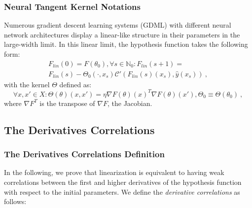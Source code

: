 \documentclass{article} %
\begin{document}
\subsubsection{Neural Tangent Kernel Notations}
\label{sec:Notations:NTK}

Numerous gradient descent learning systems (GDML) with different neural network architectures display a linear-like structure in their parameters in the large-width limit. In this linear limit, the hypothesis function takes the following form:
\begin{equation}
\begin{array}{c}
F_{lin}\left(0\right)=F\left(\theta_{0}\right),\forall s\in\mathbb{N}_{0}:F_{lin}\left(s+1\right)=\\
F_{lin}\left(s\right)-\Theta_{0}\left(\cdot,x_{s}\right)\mathcal{C}'\left(F_{lin}\left(s\right)\left(x_{s}\right),\hat{y}\left(x_{s}\right)\right)\ ,
\end{array}
\label{eq:EqOfLinF1}
\end{equation}
with the kernel $\Theta$ defined as:
\begin{equation}
\forall x,x'\in X:
\Theta\left(\theta\right)\left(x,x'\right)=\eta\nabla F\left(\theta\right)\left(x\right)^{T}\nabla F\left(\theta\right)\left(x'\right),
\Theta_{0}\equiv\Theta\left(\theta_{0}\right)\ ,
\label{eq:Kernel}
\end{equation}
where $\nabla F^{T}$ is the transpose of \(\nabla F\), the Jacobian.

\subsection{The Derivatives Correlations}

\subsubsection{The Derivatives Correlations Definition}
\label{sec:DerCorDef}

In the following, we prove that linearization is equivalent to having weak correlations between the first and higher derivatives of the hypothesis function with respect to the initial parameters. We define the \textit{derivative correlations} as follows:
\end{document}
